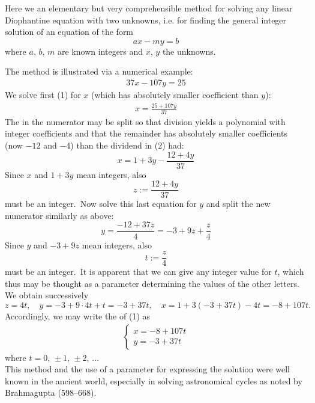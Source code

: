 \documentclass[12pt]{article}
\theoremstyle{definition}
\begin{document}
Here we  an elementary but very comprehensible method for solving any linear Diophantine equation with two unknowns, i.e. for finding the general integer solution of an equation of the form
$$ax-my = b$$
where $a,\,b,\,m$ are known integers and $x,\,y$ the unknowns.

The method is illustrated via a numerical example:
\begin{align}
37x-107y = 25
\end{align}
We solve first (1) for $x$ (which has absolutely smaller coefficient than $y$):
\begin{align}
x = \frac{25+107y}{37}
\end{align}
The  in the numerator may be split so that division yields a polynomial with integer coefficients and that the remainder has absolutely smaller coefficients (now $-12$ and $-4$) than the dividend in (2) had:
$$x = 1+3y-\frac{12+4y}{37}$$
Since $x$ and $1\!+\!3y$ mean integers, also
$$z := \frac{12+4y}{37}$$ 
must be an integer.\, Now solve this last equation for $y$ and split the new numerator similarly as above:
$$y = \frac{-12+37z}{4} = -3+9z+\frac{z}{4}$$
Since $y$ and $-3\!+\!9z$ mean integers, also 
$$t := \frac{z}{4}$$
must be an integer.\, It is apparent that we can give any integer value for $t$, which thus may be thought as a parameter determining the values of the other letters.\, We obtain successively
$$z = 4t, \quad y = -3+9\cdot4t+t = -3+37t, \quad x = 1+3(-3+37t)-4t = -8+107t.$$
Accordingly, we may write the  of (1) as
\begin{align*}
\begin{cases}
  x = -8+107t\\
  y = -3+37t
\end{cases}
\end{align*}
where\; $t = 0,\,\pm1,\,\pm2,\,\ldots$\\

This method and the use of a parameter for expressing the solution were well known in the ancient world, especially in solving astronomical cycles as noted by Brahmagupta (598--668). 

\end{document}
